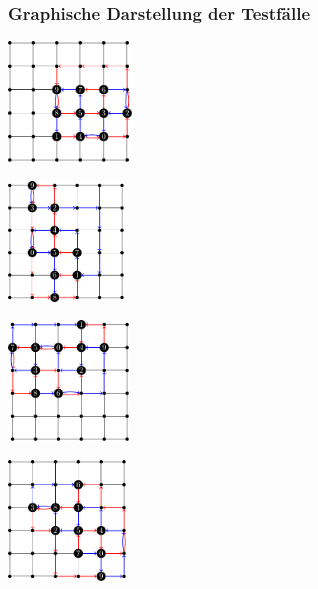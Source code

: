 \documentclass[9pt]{beamer}
\begin{document}
\begin{frame}
    \frametitle{Graphische Darstellung der Testfälle}

    \begin{minipage}{0.48\textwidth}
        \centering
        \includegraphics[height=3.2cm]{figures/Testfall3.pdf}
    \end{minipage}
    \hfill
    \begin{minipage}{0.48\textwidth}
        \centering
        \includegraphics[height=3.2cm]{figures/Testfall4.pdf}
    \end{minipage}

    \vspace{0.3cm}

    \begin{minipage}{0.48\textwidth}
        \centering
        \includegraphics[height=3.2cm]{figures/Testfall6.pdf}
    \end{minipage}
    \hfill
    \begin{minipage}{0.48\textwidth}
        \centering
        \includegraphics[height=3.2cm]{figures/Testfall7.pdf}
    \end{minipage}

\end{frame}
\end{document}

